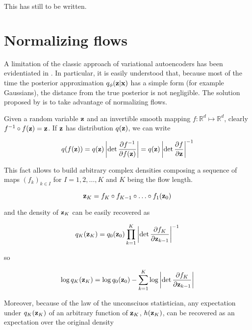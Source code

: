 \documentclass[12pt]{article}
\begin{document}
This has still to be written.

\section{Normalizing flows}
A limitation of the classic approach of variational autoencoders has been evidentiated in \cite{Mohamed2015VariationalIM}. In particular, it is easily understood that, because most of the time the posterior approximation \(q_\phi(\textbf{z}|\textbf{x})\) has a simple form (for example Gaussians), the distance from the true posterior is not negligible. The solution proposed by \cite{Mohamed2015VariationalIM} is to take advantage of normalizing flows.


Given a random variable \(\textbf{z}\) and an invertible smooth mapping \(f:\mathbb{R}^d \mapsto \mathbb{R}^d\), clearly \(f^{-1} \circ f(\textbf{z}) = \textbf{z}\). If \(\textbf{z}\) has distribution \(q(\textbf{z})\), we can write

\begin{align}
    q(f(\textbf{z})) = q(\textbf{z}) \left| \det \frac{\partial f^{-1}}{\partial f(\textbf{z})} \right| = q(\textbf{z}) \left| \det \frac{\partial f}{\partial \textbf{z}}\right|^{-1}
\end{align}

This fact allows to build arbitrary complex densities composing a sequence of maps \((f_k)_{k \in I}\) for \(I=1,2,\ldots,K\) and \(K\) being the flow length. 

\begin{equation}
    \textbf{z}_K = f_K \circ f_{K-1} \circ \ldots \circ f_1(\textbf{z}_0)
\end{equation}

and the density of \(\textbf{z}_K\) can be easily recovered as

\begin{equation}
    q_K(\textbf{z}_K) = q_0(\textbf{z}_0)\prod_{k=1}^K\left| \det \frac{\partial f_K}{\partial \textbf{z}_{k-1}}\right|^{-1}
\end{equation}

so

\begin{equation}
    \label{eqn:log_flow_den}
    \log q_K(\textbf{z}_K) = \log q_0(\textbf{z}_0) - \sum_{k=1}^K \log \left| \det \frac{\partial f_K}{\partial \textbf{z}_{k-1}}\right|
\end{equation}

Moreover, because of the law of the unconsciuos statistician, any expectation under \(q_K(\textbf{z}_K)\) of an arbitrary function of \(\textbf{z}_K\), \(h(\textbf{z}_K)\), can be recovered as an expectation over the original density
\end{document}
